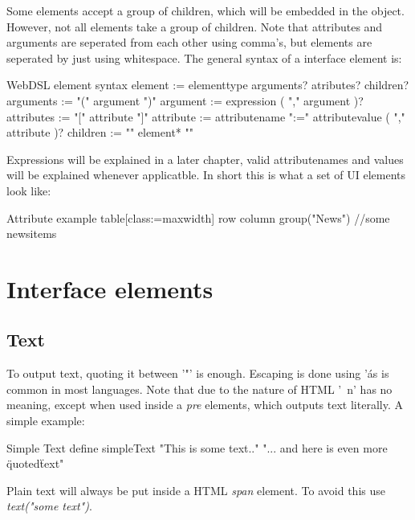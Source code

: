 Some elements accept a group of children, which will be embedded in the object. However, not all elements take a group of children. Note that attributes and arguments are seperated from each other using comma's, but elements are seperated by just using whitespace. 
The general syntax of a interface element is:
\begin{webdsl}{WebDSL element syntax}
element	:= elementtype arguments? atributes? children?
arguments	:= "(" argument ")"
argument	:= expression ( "," argument )?
attributes	:= "[" attribute "]"
attribute := attributename ":=" attributevalue ( "," attribute )?
children	:= "{" element* "}"
\end{webdsl}
Expressions will be explained in a later chapter, valid attributenames and values will be explained whenever applicatble. In short this is what a set of UI elements look like:
\begin{webdsl}{Attribute example}
table[class:=maxwidth] {
  row {
    column {
      group("News") {
				//some newsitems
			}
		}
	}
}
\end{webdsl}

\section{Interface elements}
\subsection{Text}
To output text, quoting it between '"' is enough. Escaping is done using '\' as is common in most languages. Note that due to the nature of HTML '\ n' has no meaning, except when used inside a \emph{pre} elements, which outputs text literally. A simple example:
\begin{webdsl}{Simple Text}
define simpleText {
	"This is some text.." "... and here is even more \"quoted\" text"
}
\end{webdsl}
Plain text will always be put inside a HTML \emph{span} element. To avoid this use \emph{text("some text")}.


